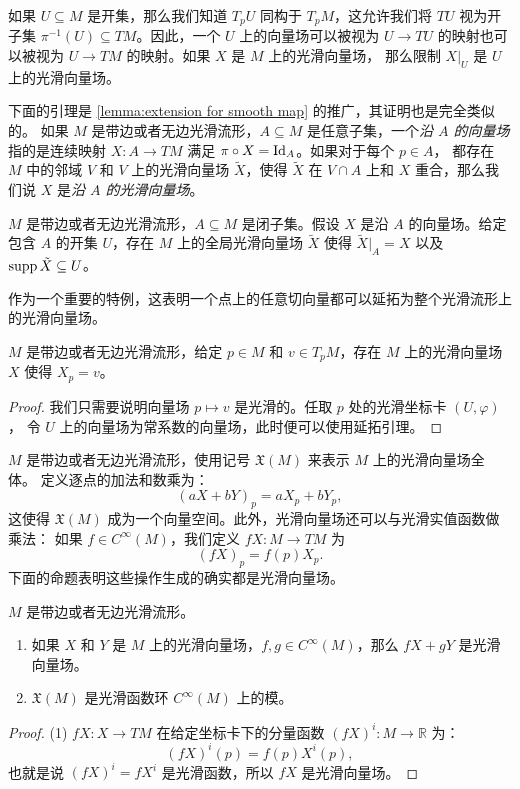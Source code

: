 如果 $U\subseteq M$ 是开集，那么我们知道 $T_pU$ 同构于 $T_pM$，这允许我们将
$TU$ 视为开子集 $\pi^{-1}(U)\subseteq TM$。因此，一个 $U$ 上的向量场可以被视为
$U\to TU$ 的映射也可以被视为 $U\to TM$ 的映射。如果 $X$ 是 $M$ 上的光滑向量场，
那么限制 $X|_U$ 是 $U$ 上的光滑向量场。

下面的引理是 \autoref{lemma:extension for smooth map} 的推广，其证明也是完全类似的。
如果 $M$ 是带边或者无边光滑流形，$A\subseteq M$ 是任意子集，一个\emph{沿 $A$ 的向量场}
指的是连续映射 $X:A\to TM$ 满足 $\pi\circ X=\operatorname{Id}_A$。如果对于每个 $p\in A$，
都存在 $M$ 中的邻域 $V$ 和 $V$ 上的光滑向量场 $\tilde X$，使得 $\tilde X$
在 $V\cap A$ 上和 $X$ 重合，那么我们说 $X$ 是\emph{沿 $A$ 的光滑向量场}。

\begin{lemma}[向量场的延拓引理]
  $M$ 是带边或者无边光滑流形，$A\subseteq M$ 是闭子集。假设 $X$ 是沿 $A$ 的向量场。给定
  包含 $A$ 的开集 $U$，存在 $M$ 上的全局光滑向量场 $\tilde X$ 使得 $\tilde X|_A=X$
  以及 $\operatorname{supp} \tilde X\subseteq U$。
\end{lemma}

作为一个重要的特例，这表明一个点上的任意切向量都可以延拓为整个光滑流形上的光滑向量场。

\begin{proposition}
  $M$ 是带边或者无边光滑流形，给定 $p\in M$ 和 $v\in T_pM$，存在 $M$ 上的光滑向量场 $X$
  使得 $X_p=v$。
\end{proposition}
\begin{proof}
  我们只需要说明向量场 $p\mapsto v$ 是光滑的。任取 $p$ 处的光滑坐标卡 $(U,\varphi)$，
  令 $U$ 上的向量场为常系数的向量场，此时便可以使用延拓引理。
\end{proof}
 
$M$ 是带边或者无边光滑流形，使用记号 $\mathfrak{X}(M)$ 来表示 $M$ 上的光滑向量场全体。
定义逐点的加法和数乘为：
\[
  (aX+bY)_p=aX_p+bY_p,
\]
这使得 $\mathfrak X(M)$ 成为一个向量空间。此外，光滑向量场还可以与光滑实值函数做乘法：
如果 $f\in C^\infty(M)$，我们定义 $fX:M\to TM$ 为
\[
  (fX)_p=f(p)X_p.
\]
下面的命题表明这些操作生成的确实都是光滑向量场。

\begin{proposition}
  $M$ 是带边或者无边光滑流形。
  \begin{enumerate}
    \item 如果 $X$ 和 $Y$ 是 $M$ 上的光滑向量场，$f,g\in C^\infty(M)$，那么
    $fX+gY$ 是光滑向量场。
    \item $\mathfrak X(M)$ 是光滑函数环 $C^\infty(M)$ 上的模。
  \end{enumerate}
\end{proposition}
\begin{proof}
  (1) $fX:X\to TM$ 在给定坐标卡下的分量函数 $(fX)^i:M\to \mathbb{R}$ 为：
  \[
    (fX)^i(p)=f(p)X^i(p),
  \]
  也就是说 $(fX)^i=fX^i$ 是光滑函数，所以 $fX$ 是光滑向量场。
\end{proof}

